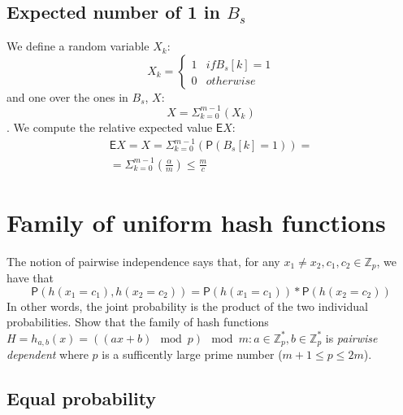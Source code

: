 \documentclass{article}
\newcommand*{\expect}{\mathsf{E}}  %
\newcommand*{\prob}{\mathsf{P}}    %
\begin{document}
\subsection{Expected number of 1 in $B_{s}$}
We define a random variable $X_{k}$:
    \begin{equation*}
    X_{k} = \begin{cases}
            1   & if B_{s}[k] = 1  \\
            0   & otherwise
            \end{cases}
    \end{equation*}
and one over the ones in $B_{s}$, $X$:
    \begin{equation}
        X = \Sigma_{k = 0}^{m - 1}(X_k)
    \end{equation}.
We compute the relative expected value $\expect{X}$:
    \begin{gather*}
    \expect{X} = X = \Sigma_{k = 0}^{m - 1}(\prob(B_{s}[k] = 1)) = \\
    = \Sigma_{k = 0}^{m - 1}(\frac{\alpha}{m}) \leq \frac{m}{c}
    \end{gather*}

\newpage
\section{Family of uniform hash functions}

The notion of pairwise independence says that, for any $x_{1} \neq x_{2}, c_{1}, c_{2}
\in \mathbb{Z}_{p}$, we have that
    \begin{equation}
    \prob(h(x_{1} = c_{1}), h(x_{2} = c_{2})) = \prob(h(x_{1} = c_{1})) * \prob(h(x_{2} = c_{2}))
    \end{equation}
In other words, the joint probability is the product of the two individual probabilities.
Show that the family of hash functions $H = {h_{a,b}(x) = ((ax + b) \mod p) \mod m}:
a \in \mathbb{Z}^{*}_{p},
b \in \mathbb{Z}^{*}_{p}$ is \emph{pairwise dependent}
where $p$ is a sufficently large prime number ($m + 1 \leq p \leq 2m$).

\subsection{Equal probability}
\end{document}
